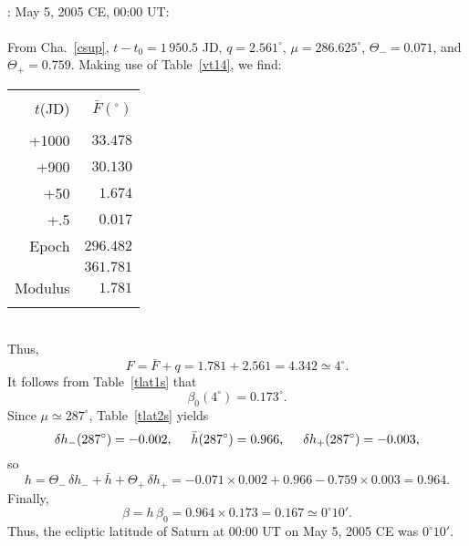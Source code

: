 ~\\
: May 5, 2005 CE, 00:00 UT:\\
~\\
From Cha.~\ref{csup}, $t-t_0=1\,950.5$ JD, 
$q= 2.561^\circ$,  $\mu= 286.625^\circ$, $\Theta_-=0.071$, and
$\Theta_+ = 0.759$.
 Making use of
Table~\ref{vt14}, we find:\\
\begin{tabular}{rr}
&\\
$t$(JD) & $\bar{F}(^\circ)$\\[-2ex]
&\\
+1000 & $33.478$ \\
+900 & $30.130$\\
+50 & $1.674$ \\
+.5 & $0.017$\\
Epoch & $296.482$ \\\cline{2-2}
&$361.781$ \\\cline{2-2}
Modulus & $1.781$ \\ 
&\\
\end{tabular}\\
Thus,
$$
F = \bar{F} + q =1.781+2.561 = 4.342\simeq 4^\circ.
$$
It follows from Table~\ref{tlat1s} that
$$
\beta_0(4^\circ) = 0.173^\circ.
$$
Since $\mu\simeq 287^\circ$, Table~\ref{tlat2s} yields
$$
\delta h_-(287^\circ) = -0.002,\mbox{\hspace{0.5cm}}\bar{h}(287^\circ)=0.966, \mbox{\hspace{0.5cm}}\delta h_+(287^\circ) = -0.003,
$$
so
$$
h = \Theta_-\,\delta h_- + \bar{h}+\Theta_+\,\delta h_+ = -0.071\times 0.002 +0.966-0.759\times 0.003 = 0.964.
$$
Finally,
$$
\beta = h\,\beta_0 = 0.964\times 0.173 = 0.167 \simeq 0^\circ 10'.
$$
Thus,
the ecliptic latitude of Saturn at 00:00 UT on May 5, 2005 CE was $0^\circ 10'$.



